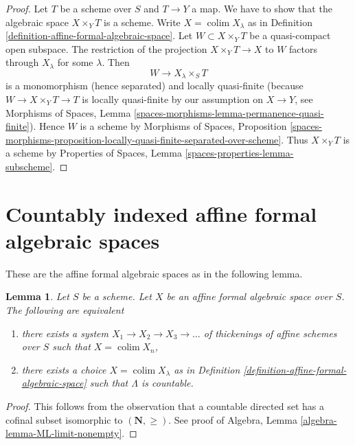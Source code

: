 \documentclass{stacks-project}
\theoremstyle{plain}
\newtheorem{lemma}[subsection]{Lemma}
\theoremstyle{definition}
\theoremstyle{remark}
\numberwithin{equation}{subsection}
\def\colim{\mathop{\mathrm{colim}}\nolimits}
\begin{document}
\begin{proof}
Let $T$ be a scheme over $S$ and $T \to Y$ a map. We have to show that
the algebraic space $X \times_Y T$ is a scheme. Write $X = \colim X_\lambda$
as in Definition
\ref{definition-affine-formal-algebraic-space}.
Let $W \subset X \times_Y T$
be a quasi-compact open subspace. The restriction of the projection
$X \times_Y T \to X$ to $W$ factors through $X_\lambda$ for some $\lambda$.
Then
$$
W \to X_\lambda \times_S T
$$
is a monomorphism (hence separated) and locally quasi-finite (because
$W \to X \times_Y T \to T$ is locally quasi-finite by our assumption
on $X \to Y$, see Morphisms of Spaces, Lemma
\ref{spaces-morphisms-lemma-permanence-quasi-finite}).
Hence $W$ is a scheme by
Morphisms of Spaces, Proposition
\ref{spaces-morphisms-proposition-locally-quasi-finite-separated-over-scheme}.
Thus $X \times_Y T$ is a scheme by
Properties of Spaces, Lemma \ref{spaces-properties-lemma-subscheme}.
\end{proof}






\section{Countably indexed affine formal algebraic spaces}
\label{section-countably-indexed}

\noindent
These are the affine formal algebraic spaces as in the following lemma.

\begin{lemma}
\label{lemma-countable-affine-formal-algebraic-space}
Let $S$ be a scheme. Let $X$ be an affine formal algebraic space over $S$.
The following are equivalent
\begin{enumerate}
\item there exists a system $X_1 \to X_2 \to X_3 \to \ldots$
of thickenings of affine schemes over $S$ such that $X = \colim X_n$,
\item there exists a choice $X = \colim X_\lambda$ as in
Definition \ref{definition-affine-formal-algebraic-space}
such that $\Lambda$ is countable.
\end{enumerate}
\end{lemma}

\begin{proof}
This follows from the observation that a countable directed set
has a cofinal subset isomorphic to $(\mathbf{N}, \geq)$.
See proof of Algebra, Lemma \ref{algebra-lemma-ML-limit-nonempty}.
\end{proof}
\end{document}
